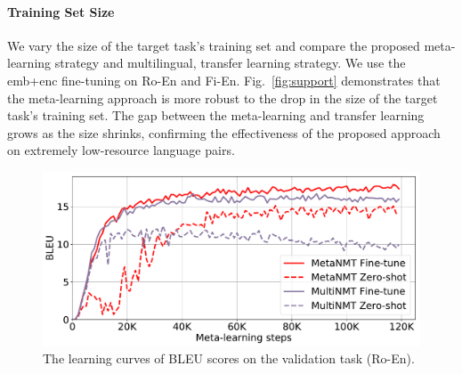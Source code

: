 

\paragraph{Training Set Size}

We vary the size of the target task's training set and compare the proposed meta-learning strategy and multilingual, transfer learning strategy. We use the emb+enc fine-tuning on Ro-En and Fi-En. Fig.~\ref{fig:support} demonstrates that the meta-learning approach is more robust to the drop in the size of the target task's training set. The gap between the meta-learning and transfer learning grows as the size shrinks, confirming the effectiveness of the proposed approach on extremely low-resource language pairs.

\begin{figure}[htpb]
    \centering
    \includegraphics[width=\linewidth]{figs/meta/curve.pdf}
    \caption{The learning curves of BLEU scores on the validation task (Ro-En).}%
    \label{fig:train curve}
    \vspace{-10pt}
\end{figure}


